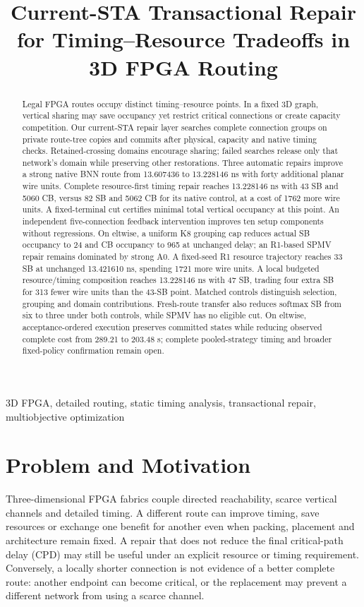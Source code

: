 \documentclass[conference,10pt]{IEEEtran}
\title{Current-STA Transactional Repair for Timing--Resource Tradeoffs in 3D FPGA Routing}
\author{\IEEEauthorblockN{Anonymous development manuscript}}
\begin{document}
\maketitle
\begin{abstract}
Legal FPGA routes occupy distinct timing--resource points. In a fixed 3D graph, vertical sharing may save occupancy yet restrict critical connections or create capacity competition. Our current-STA repair layer searches complete connection groups on private route-tree copies and commits after physical, capacity and native timing checks. Retained-crossing domains encourage sharing; failed searches release only that network's domain while preserving other restorations. Three automatic repairs improve a strong native BNN route from 13.607436 to 13.228146 ns with forty additional planar wire units. Complete resource-first timing repair reaches 13.228146 ns with 43 SB and 5060 CB, versus 82 SB and 5062 CB for its native control, at a cost of 1762 more wire units. A fixed-terminal cut certifies minimal total vertical occupancy at this point. An independent five-connection feedback intervention improves ten setup components without regressions. On eltwise, a uniform K8 grouping cap reduces actual SB occupancy to 24 and CB occupancy to 965 at unchanged delay; an R1-based SPMV repair remains dominated by strong A0. A fixed-seed R1 resource trajectory reaches 33 SB at unchanged 13.421610 ns, spending 1721 more wire units. A local budgeted resource/timing composition reaches 13.228146 ns with 47 SB, trading four extra SB for 313 fewer wire units than the 43-SB point. Matched controls distinguish selection, grouping and domain contributions. Fresh-route transfer also reduces softmax SB from six to three under both controls, while SPMV has no eligible cut. On eltwise, acceptance-ordered execution preserves committed states while reducing observed complete cost from 289.21 to 203.48 s; complete pooled-strategy timing and broader fixed-policy confirmation remain open.
\end{abstract}
\begin{IEEEkeywords}
3D FPGA, detailed routing, static timing analysis, transactional repair, multiobjective optimization
\end{IEEEkeywords}

\section{Problem and Motivation}
Three-dimensional FPGA fabrics couple directed reachability, scarce vertical channels and detailed timing. A different route can improve timing, save resources or exchange one benefit for another even when packing, placement and architecture remain fixed. A repair that does not reduce the final critical-path delay (CPD) may still be useful under an explicit resource or timing requirement. Conversely, a locally shorter connection is not evidence of a better complete route: another endpoint can become critical, or the replacement may prevent a different network from using a scarce channel.
\end{document}
